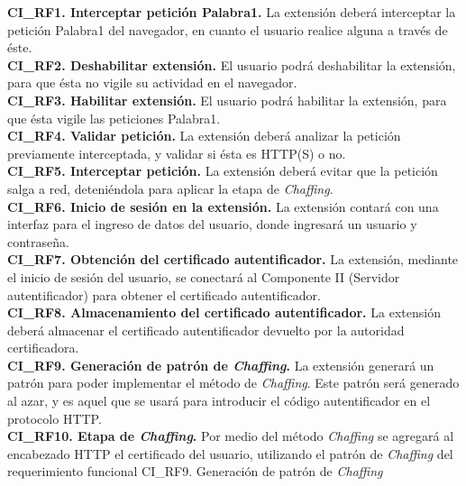 \documentclass[12pt, a4paper, titlepage]{report}
\begin{document}
				{\setlength{\parindent}{12pt}
				
			    \textbf{CI\_RF1. Interceptar petición \acrshort{Palabra1}.} La extensión deberá interceptar la petición \acrshort{Palabra1} del navegador, en cuanto el usuario realice alguna a través de éste.\\

				\textbf{CI\_RF2. Deshabilitar extensión.} El usuario podrá deshabilitar la extensión, para que ésta no vigile su actividad en el navegador.\\
				
				\textbf{CI\_RF3. Habilitar extensión.} El usuario podrá habilitar la extensión, para que ésta vigile las peticiones \acrshort{Palabra1}.\\
				
				\textbf{CI\_RF4. Validar petición.} La extensión deberá analizar la petición previamente interceptada, y validar si ésta es HTTP(S) o no.\\
				
				\textbf{CI\_RF5. Interceptar petición.} La extensión deberá evitar que la petición salga a red, deteniéndola para aplicar la etapa de \textit{Chaffing}.\\ 
				
				\textbf{CI\_RF6. Inicio de sesi\'on en la extensi\'on.} La extensi\'on contar\'a con una interfaz para el ingreso de datos del usuario, donde ingresará un usuario y contraseña. \\  
				
                \textbf{CI\_RF7. Obtención del certificado autentificador.} La extensión, mediante el inicio de sesión del usuario, se conectará al Componente II (Servidor autentificador) para obtener el certificado autentificador.\\ 
                
                \textbf{CI\_RF8. Almacenamiento del certificado autentificador.} La extensi\'on deberá almacenar el certificado autentificador devuelto por la autoridad certificadora.\\
                
                \textbf{CI\_RF9. Generación de patrón de \textit{Chaffing}.} La extensión generará un patrón para poder implementar el método de \textit{Chaffing}. Este patrón será generado al azar, y es aquel que se usará para introducir el código autentificador en el protocolo HTTP.\\
                
				\textbf{CI\_RF10. Etapa de \textit{Chaffing}.} Por medio del m\'etodo \textit{Chaffing} se agregará al encabezado HTTP el certificado del usuario, utilizando el patrón de \textit{Chaffing} del requerimiento funcional CI\_RF9. Generación de patrón de \textit{Chaffing}\\
                    
}
\end{document}
